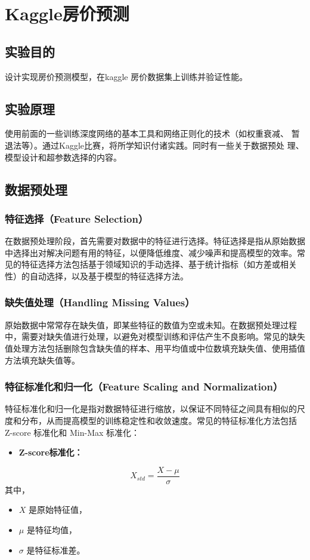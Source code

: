 \documentclass[a4paper,12pt]{article}
\begin{document}
\newpage
\section{Kaggle房价预测}
\subsection{实验目的}
设计实现房价预测模型，在kaggle 房价数据集上训练并验证性能。

\subsection{实验原理}
使用前面的一些训练深度网络的基本工具和网络正则化的技术（如权重衰减、
暂退法等）。通过Kaggle比赛，将所学知识付诸实践。同时有一些关于数据预处
理、模型设计和超参数选择的内容。

\subsection{数据预处理}
\subsubsection{特征选择（Feature Selection）}
在数据预处理阶段，首先需要对数据中的特征进行选择。特征选择是指从原始数据中选择出对解决问题有用的特征，以便降低维度、减少噪声和提高模型的效率。常见的特征选择方法包括基于领域知识的手动选择、基于统计指标（如方差或相关性）的自动选择，以及基于模型的特征选择方法。

\subsubsection{缺失值处理（Handling Missing Values）}
原始数据中常常存在缺失值，即某些特征的数值为空或未知。在数据预处理过程中，需要对缺失值进行处理，以避免对模型训练和评估产生不良影响。常见的缺失值处理方法包括删除包含缺失值的样本、用平均值或中位数填充缺失值、使用插值方法填充缺失值等。

\subsubsection{特征标准化和归一化（Feature Scaling and Normalization）}
特征标准化和归一化是指对数据特征进行缩放，以保证不同特征之间具有相似的尺度和分布，从而提高模型的训练稳定性和收敛速度。常见的特征标准化方法包括 Z-score 标准化和 Min-Max 标准化：
\begin{itemize}
\item \textbf{Z-score标准化：}
\end{itemize}
\[X_{std} = \frac{X-\mu}{\sigma}\]
其中，
\begin{itemize}
\item $X$ 是原始特征值，
\item $\mu$ 是特征均值，
\item $\sigma$ 是特征标准差。
\end{itemize}
\end{document}
